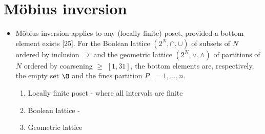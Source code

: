 \chapter{M\"obius inversion}
\begin{itemize}
	\item M\"obius inversion applies to any (locally finite) poset, provided a bottom element exists [25]. For the Boolean lattice $(2^N, \cap, \cup)$ of subsets of $N$ ordered by inclusion $\supseteq$ and the geometric lattice $(2^N, \vee, \wedge)$ of partitions of $N$ ordered by coarsening $\ge$ $[1, 31]$, the bottom elements are, respectively, the empty set $\O$ and the fines partition $P_\bot = {{1}, ..., {n}}$.
		\begin{enumerate}
			\item Locally finite poset - where all intervals are finite
			\item Boolean lattice - 
			\item Geometric lattice
		\end{enumerate} 
\end{itemize}